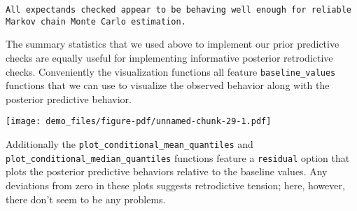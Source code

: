 \documentclass[
  letterpaper,
  DIV=11,
  numbers=noendperiod]{scrartcl}
\newenvironment{Shaded}{\begin{snugshade}}{\end{snugshade}}
\newcommand{\AttributeTok}[1]{\textcolor[rgb]{0.40,0.45,0.13}{#1}}
\newcommand{\DecValTok}[1]{\textcolor[rgb]{0.68,0.00,0.00}{#1}}
\newcommand{\FunctionTok}[1]{\textcolor[rgb]{0.28,0.35,0.67}{#1}}
\newcommand{\NormalTok}[1]{\textcolor[rgb]{0.00,0.23,0.31}{#1}}
\newcommand{\SpecialCharTok}[1]{\textcolor[rgb]{0.37,0.37,0.37}{#1}}
\newcommand{\StringTok}[1]{\textcolor[rgb]{0.13,0.47,0.30}{#1}}
\begin{document}
\begin{verbatim}
All expectands checked appear to be behaving well enough for reliable
Markov chain Monte Carlo estimation.
\end{verbatim}

The summary statistics that we used above to implement our prior
predictive checks are equally useful for implementing informative
posterior retrodictive checks. Conveniently the visualization functions
all feature \texttt{baseline\_values} functions that we can use to
visualize the observed behavior along with the posterior predictive
behavior.

\begin{Shaded}
\end{Shaded}

\texttt{[image: demo\_files/figure-pdf/unnamed-chunk-29-1.pdf]}

Additionally the \texttt{plot\_conditional\_mean\_quantiles} and
\texttt{plot\_conditional\_median\_quantiles} functions feature a
\texttt{residual} option that plots the posterior predictive behaviors
relative to the baseline values. Any deviations from zero in these plots
suggests retrodictive tension; here, however, there don't seem to be any
problems.
\end{document}
